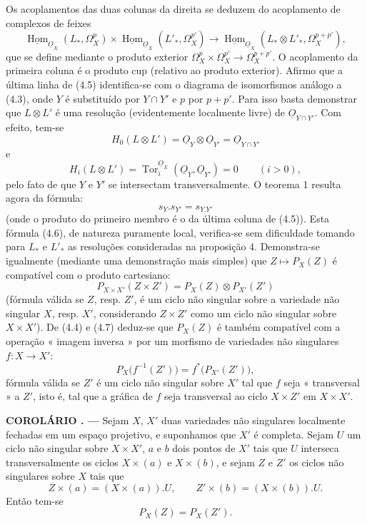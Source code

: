 \documentclass[11pt,twoside,openany]{book}
\numberwithin{equation}{section}
\newcommand{\src}[1]{%
  \phantomsection\hypertarget{src:#1}{}%
  \marginpar{\raggedleft\footnotesize\sffamily #1}%
}
\newcommand{\Osh}{\underline{O}}
\newcommand{\Homsh}{\underline{\operatorname{Hom}}}
\theoremstyle{plain}
\theoremstyle{definition}
\theoremstyle{remark}
\newcommand{\result}[2]{%
  \par\medskip\noindent\textbf{#1%
  \if\relax\detokenize{#2}\relax\else\space#2\fi. ---}\enspace
}
\newcommand{\FgaUnitKey}{frontmatter}
\renewcommand{\src}[1]{%
  \phantomsection\hypertarget{src:\FgaUnitKey:#1}{}%
  \marginpar{\raggedleft\footnotesize\sffamily #1}%
}
\begin{document}
\src{180}
Os acoplamentos das duas colunas da direita se deduzem do acoplamento de
complexos de feixes
\[
\Homsh_{\Osh_X}(L_{*},\Omega_X^{p})
\times\Homsh_{\Osh_X}(L'_{*},\Omega_X^{p'})
\longrightarrow
\Homsh_{\Osh_X}(L_{*}\otimes L'_{*},\Omega_X^{p+p'}),
\]
que se define mediante o produto exterior
$\Omega_X^{p}\times\Omega_X^{p'}\longrightarrow\Omega_X^{p+p'}$.
O acoplamento da primeira coluna é o produto cup (relativo ao produto
exterior). Afirmo que a última linha de (4.5) identifica-se com o diagrama
de isomorfismos análogo a (4.3), onde $Y$ é substituído por $Y\cap Y'$ e $p$ por
$p+p'$. Para isso basta demonstrar que $L\otimes L'$ é uma resolução
(evidentemente localmente livre) de $\Osh_{Y\cap Y'}$. Com efeito, tem-se
\[
  H_0(L\otimes L')=\Osh_Y\otimes\Osh_{Y'}=\Osh_{Y\cap Y'}
\]
e
\[
  H_i(L\otimes L')=\operatorname{Tor}_{i}^{\Osh_X}(\Osh_Y,\Osh_{Y'})=0
  \qquad(i>0),
\]
pelo fato de que $Y$ e $Y'$ se intersectam transversalmente. O teorema 1 resulta
agora da fórmula:
\begin{equation}\tag{4.6}
  s_Y.s_{Y'}=s_{Y.Y'}
\end{equation}
(onde o produto do primeiro membro é o da última coluna de (4.5)).
Esta fórmula (4.6), de natureza puramente local, verifica-se sem dificuldade
tomando para $L_{*}$ e $L'_{*}$ as resoluções consideradas na proposição
4. Demonstra-se igualmente (mediante uma demonstração mais simples) que
$Z\longmapsto P_X(Z)$ é compatível com o produto cartesiano:
\begin{equation}\tag{4.7}
  P_{X\times X'}(Z\times Z')=P_X(Z)\otimes P_{X'}(Z')
\end{equation}
(fórmula válida se $Z$, resp. $Z'$, é um ciclo não singular sobre a variedade
não singular $X$, resp. $X'$, considerando $Z\times Z'$ como um ciclo não
singular sobre $X\times X'$). De (4.4) e (4.7) deduz-se que $P_X(Z)$ é também
compatível com a operação « imagem inversa » por um morfismo de variedades não
singulares $f:X\longrightarrow X'$:
\begin{equation}\tag{4.8}
  P_X\bigl(f^{-1}(Z')\bigr)=f^{*}\bigl(P_{X'}(Z')\bigr),
\end{equation}
fórmula válida se $Z'$ é um ciclo não singular sobre $X'$ tal que $f$ seja
« transversal » a $Z'$, isto é, tal que a gráfica de $f$ seja transversal ao ciclo
$X\times Z'$ em $X\times X'$.

\src{181}
\result{COROLÁRIO}{1} Sejam $X$, $X'$ duas variedades não singulares
localmente fechadas em um espaço projetivo, e suponhamos que $X'$ é completa. Sejam $U$
um ciclo não singular sobre $X\times X'$, $a$ e $b$ dois pontos de $X'$ tais que
$U$ interseca transversalmente os ciclos $X\times(a)$ e $X\times(b)$, e sejam $Z$
e $Z'$ os ciclos não singulares sobre $X$ tais que
\[
  Z\times(a)=(X\times(a)).U,
  \qquad
  Z'\times(b)=(X\times(b)).U.
\]
Então tem-se
\[
  P_X(Z)=P_X(Z').
\]
\end{document}
